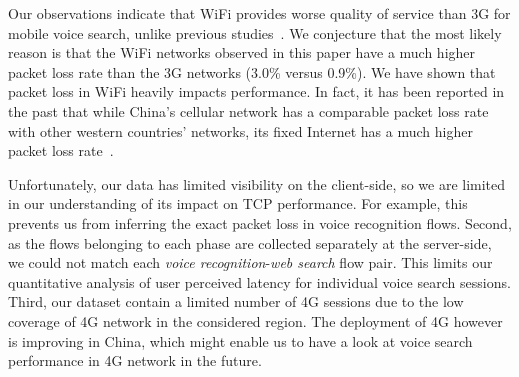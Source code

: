 Our observations indicate that WiFi provides worse quality of service than 3G for mobile voice search, unlike previous studies~\cite{sommers2012cell}. We conjecture that the most likely reason is that the WiFi networks observed in this paper have a much higher packet loss rate than the 3G networks (3.0\% versus 0.9\%). We have shown that packet loss in WiFi heavily impacts performance. In fact, it has been reported in the past that while China's cellular network has a comparable packet loss rate with other western countries' networks, its fixed Internet has a much higher packet loss rate~\cite{HeikkinenB12}. 

Unfortunately, our data has limited visibility on the client-side, so we are limited in our understanding of its impact on TCP performance. For example, this prevents us from inferring the exact packet loss in voice recognition flows. Second, as the flows belonging to each phase are collected separately at the server-side, we could not match each \emph{voice recognition}-\emph{web search} flow pair. This limits our quantitative analysis of user perceived latency for individual voice search sessions. Third, our dataset contain a limited number of 4G sessions due to the low coverage of 4G network in the considered region. The deployment of 4G however is improving in China, which might enable us to have a look at voice search performance in 4G network in the future.
